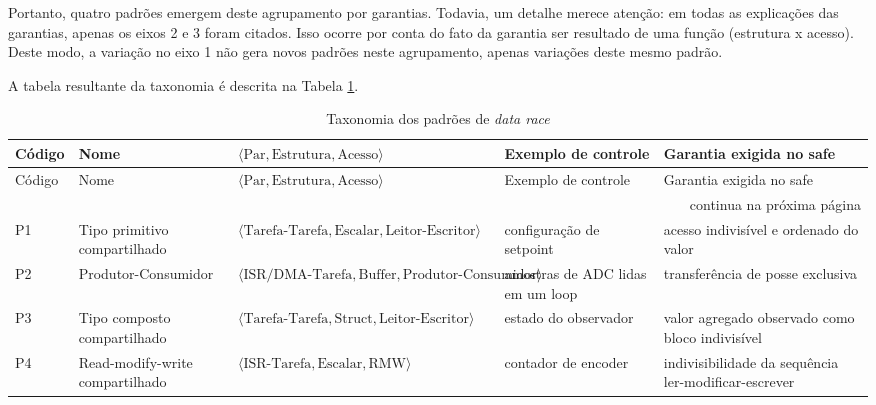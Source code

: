 Portanto, quatro padrões emergem deste agrupamento por garantias. Todavia, um detalhe merece atenção: em todas as explicações das garantias, apenas os eixos 2 e 3 foram citados. Isso ocorre por conta do fato da garantia ser resultado de uma função (estrutura x acesso). Deste modo, a variação no eixo 1 não gera novos padrões neste agrupamento, apenas variações deste mesmo padrão.

A tabela resultante da taxonomia é descrita na Tabela \ref{tab:taxonomia}.

\begin{landscape}
  \small
  \setlength{\textwidth}{\textheight}%
  \setlength{\linewidth}{\textwidth}%
  \begin{longtable}{l >{\raggedright\arraybackslash}p{3cm} >{\raggedright\arraybackslash}p{8cm} >{\raggedright\arraybackslash}p{2.8cm} >{\raggedright\arraybackslash}p{3.8cm}}
    \caption{Taxonomia dos padrões de \textit{data race}}\label{tab:taxonomia}\\
    \toprule
    Código & Nome & $\langle\text{Par},\text{Estrutura},\text{Acesso}\rangle$ & Exemplo de controle & Garantia exigida no safe \\
    \midrule
    \endfirsthead
    \toprule
    Código & Nome & $\langle\text{Par},\text{Estrutura},\text{Acesso}\rangle$ & Exemplo de controle & Garantia exigida no safe \\
    \midrule
    \endhead
    \midrule
    \multicolumn{5}{r}{\footnotesize continua na próxima página} \\
    \endfoot
    \bottomrule
    \endlastfoot
    P1 & Tipo primitivo compartilhado & $\langle\text{Tarefa-Tarefa},\text{Escalar},\text{Leitor-Escritor}\rangle$ & configuração de setpoint & acesso indivisível e ordenado do valor \\ \hline
    P2 & Produtor-Consumidor & $\langle\text{ISR/DMA-Tarefa},\text{Buffer},\text{Produtor-Consumidor}\rangle$ & amostras de ADC lidas em um loop & transferência de posse exclusiva \\ \hline
    P3 & Tipo composto compartilhado & $\langle\text{Tarefa-Tarefa},\text{Struct},\text{Leitor-Escritor}\rangle$ & estado do observador & valor agregado observado como bloco indivisível \\ \hline
    P4 & Read-modify-write compartilhado & $\langle\text{ISR-Tarefa},\text{Escalar},\text{RMW}\rangle$ & contador de encoder & indivisibilidade da sequência ler-modificar-escrever \\
  \end{longtable}
\end{landscape}

